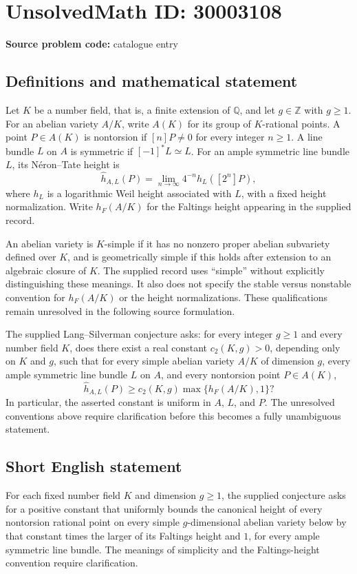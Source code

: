 \documentclass[11pt]{article}
\newcommand{\Z}{\mathbb{Z}}
\newcommand{\Q}{\mathbb{Q}}
\begin{document}
\section*{UnsolvedMath ID: 30003108}
\textbf{Source problem code:} catalogue entry
\subsection{Definitions and mathematical statement}
Let $K$ be a number field, that is, a finite extension of $\Q$, and let $g\in\Z$ with $g\geq 1$. For an abelian variety $A/K$, write $A(K)$ for its group of $K$-rational points. A point $P\in A(K)$ is nontorsion if $[n]P\neq 0$ for every integer $n\geq 1$. A line bundle $L$ on $A$ is symmetric if $[-1]^*L\simeq L$. For an ample symmetric line bundle $L$, its N\'eron--Tate height is
\[
\widehat h_{A,L}(P)=\lim_{n\to\infty}4^{-n}h_L([2^n]P),
\]
where $h_L$ is a logarithmic Weil height associated with $L$, with a fixed height normalization. Write $h_F(A/K)$ for the Faltings height appearing in the supplied record.

An abelian variety is $K$-simple if it has no nonzero proper abelian subvariety defined over $K$, and is geometrically simple if this holds after extension to an algebraic closure of $K$. The supplied record uses ``simple'' without explicitly distinguishing these meanings. It also does not specify the stable versus nonstable convention for $h_F(A/K)$ or the height normalizations. These qualifications remain unresolved in the following source formulation.

The supplied Lang--Silverman conjecture asks: for every integer $g\geq 1$ and every number field $K$, does there exist a real constant $c_2(K,g)>0$, depending only on $K$ and $g$, such that for every simple abelian variety $A/K$ of dimension $g$, every ample symmetric line bundle $L$ on $A$, and every nontorsion point $P\in A(K)$,
\[
\widehat h_{A,L}(P)\geq c_2(K,g)\max\{h_F(A/K),1\}?
\]
In particular, the asserted constant is uniform in $A$, $L$, and $P$. The unresolved conventions above require clarification before this becomes a fully unambiguous statement.
\subsection{Short English statement}
For each fixed number field $K$ and dimension $g\geq 1$, the supplied conjecture asks for a positive constant that uniformly bounds the canonical height of every nontorsion rational point on every simple $g$-dimensional abelian variety below by that constant times the larger of its Faltings height and $1$, for every ample symmetric line bundle. The meanings of simplicity and the Faltings-height convention require clarification.
\end{document}
